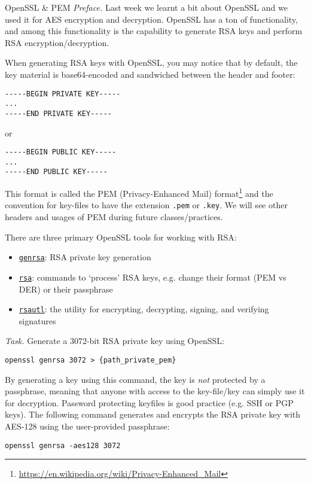 \documentclass{practice}
\begin{document}
\begin{task}{OpenSSL \& PEM}
  \textit{Preface.}
  Last week we learnt a bit about OpenSSL and we used it for AES encryption and decryption.
  OpenSSL has a ton of functionality, and among this functionality is the capability to generate RSA keys and perform RSA encryption/decryption.

  When generating RSA keys with OpenSSL, you may notice that by default, the key material is base64-encoded and sandwiched between the header and footer:
  \begin{Verbatim}
-----BEGIN PRIVATE KEY-----
...
-----END PRIVATE KEY-----
  \end{Verbatim}
  or
  \begin{Verbatim}
-----BEGIN PUBLIC KEY-----
...
-----END PUBLIC KEY-----
  \end{Verbatim}
  This format is called the PEM (Privacy-Enhanced Mail) format\footnote{\url{https://en.wikipedia.org/wiki/Privacy-Enhanced_Mail}} and the convention for key-files to have the extension \texttt{.pem} or \texttt{.key}.
  We will see other headers and usages of PEM during future classes/practices.

  There are three primary OpenSSL tools for working with RSA:
  \begin{itemize}
    \item \href{https://www.openssl.org/docs/man1.0.2/man1/genrsa.html}{\texttt{genrsa}}: RSA private key generation
    \item \href{https://www.openssl.org/docs/man1.1.1/man1/rsa.html}{\texttt{rsa}}: commands to `process' RSA keys, e.g. change their format (PEM vs DER) or their passphrase
    \item \href{https://www.openssl.org/docs/man1.0.2/man1/rsautl.html}{\texttt{rsautl}}: the utility for encrypting, decrypting, signing, and verifying signatures
  \end{itemize}

  \textit{Task.}
  Generate a $3072$-bit RSA private key using OpenSSL:
  \begin{Verbatim}
openssl genrsa 3072 > {path_private_pem}
  \end{Verbatim}

  \begin{tcolorbox}[title=Warning]
    By generating a key using this command, the key is \emph{not} protected by a passphrase, meaning that anyone with access to the key-file/key can simply use it for decryption.
    \tcblower
    Password protecting keyfiles is good practice (e.g. SSH or PGP keys).
    The following command generates and encrypts the RSA private key with AES-128 using the user-provided passphrase:
    \begin{Verbatim}
openssl genrsa -aes128 3072
    \end{Verbatim}
  \end{tcolorbox}


\end{task}
\end{document}
